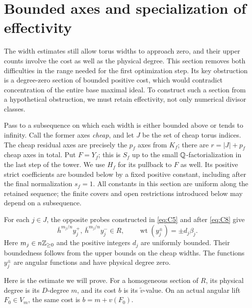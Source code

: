\section{Bounded axes and specialization of effectivity}
\label{b:bounded-axes}

The width estimates still allow torus widths to approach zero, and their
upper counts involve the cost as well as the physical degree. This section
removes both difficulties in the range needed for the first optimization
step. Its key obstruction is a degree-zero section of bounded positive
cost, which would contradict concentration of the entire base maximal
ideal. To construct such a section from a hypothetical obstruction, we
must retain effectivity, not only numerical divisor classes.

Pass to a subsequence on which each width is either bounded above or tends
to infinity. Call the former axes \emph{cheap}, and let \(J\) be the set of
cheap torus indices. The cheap residual axes are precisely the \(p_f\) axes
from \(K_f\); there are \(r=|J|+p_f\) cheap axes in total.
Put \(F=Y_f\); this is \(S_f\) up to the small
\(\mathbb Q\)-factorialization in the last step of the tower. We use \(H_f\) for
its pullback to \(F\) as well. Its positive strict coefficients are bounded
below by a fixed positive constant, including after the final normalization
\(s_f=1\). All constants in this section are uniform along the retained
sequence; the finite covers and open restrictions introduced below may
depend on a subsequence.

For each \(j\in J\), the opposite probes constructed in
\eqref{eq:C5} and after \eqref{eq:C8} give
\[
 \bar h^{m_j/n}y_j^+,\ \bar h^{m_j/n}y_j^-\in R,
 \qquad \operatorname{wt}(y_j^\pm)=\pm d_j\beta_j.
\]
Here \(m_j\in n\mathbb Z_{\geq0}\) and the positive integers \(d_j\) are uniformly
bounded. Their boundedness follows from the upper bounds on the cheap
widths. The functions \(y_j^\pm\) are angular functions and have physical
degree zero.

Here is the estimate we will prove. For a homogeneous section of
\(R\), its physical degree is its \(D\)-degree \(m\), and its cost
\(b\) is its \(\tilde v\)-value. On an actual angular lift
\(F_0\in V_m\), the same cost is \(b=m+v(F_0)\).

